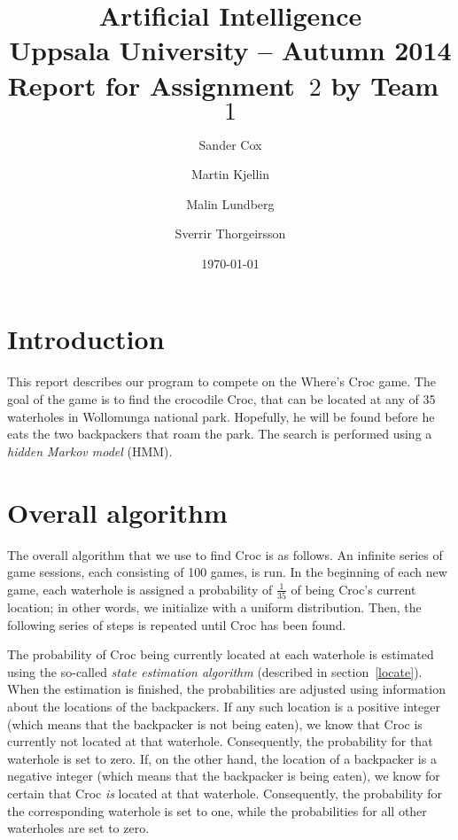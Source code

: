 \documentclass[a4paper]{article}
\title{\textbf{Artificial Intelligence \\
    Uppsala University -- Autumn 2014 \\
    Report for Assignment~$2$
    by Team~$1$
  }
}
\author{Sander Cox \and Martin Kjellin \and Malin Lundberg \and Sverrir
  Thorgeirsson}
\date{\today}
\begin{document}
\maketitle

\section{Introduction}

This report describes our program to compete
on the Where's Croc game. The goal of the game is to find the crocodile Croc,
that can be located at any of 35 waterholes in Wollomunga national
park. Hopefully, he will be found before he eats the two backpackers that roam
the park. The search is performed using a \emph{hidden Markov model}
(HMM).

\section{Overall algorithm}
\label{overall}

The overall algorithm that we use to find Croc is as follows. An infinite series of
game sessions, each consisting of 100 games, is run. In the beginning of each new
game, each waterhole is assigned a probability of $\frac{1}{35}$ of being Croc's
current location; in other words, we initialize with a uniform distribution. Then, the
following series of steps is repeated until Croc has been found.

The probability of Croc being currently located at each waterhole is estimated using the so-called \emph{state estimation algorithm} (described in
section~\ref{locate}). %
When the estimation is finished, the probabilities are adjusted using
information about the locations of the backpackers. If any such location is a
positive integer (which means that the backpacker is not being eaten), we know
that Croc is currently not located at that waterhole. Consequently, the
probability for that waterhole is set to zero. If, on the other hand, the
location of a backpacker is a negative integer (which means that the backpacker is
being eaten), we know for certain that Croc \emph{is} located at that waterhole. Consequently, the
probability for the corresponding waterhole is set to one, while the
probabilities for all other waterholes are set to zero.
\end{document}
